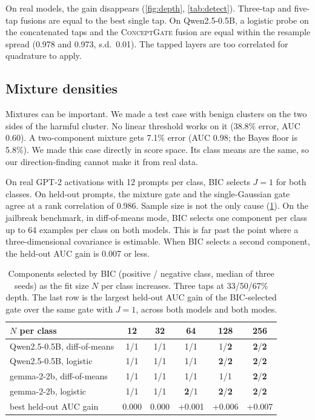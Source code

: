 \documentclass[11pt]{article}
\newcommand{\cg}{\textsc{ConceptGate}}
\begin{document}
On real models, the gain disappears (\cref{fig:depth}, \cref{tab:detect}). Three-tap and five-tap fusions
are equal to the best single tap. On Qwen2.5-0.5B, a logistic probe on the concatenated taps and the \cg{} fusion are equal within the resample spread (0.978 and 0.973, s.d.\ 0.01). The tapped layers are too correlated for quadrature to
apply.

\subsection{Mixture densities}
\label{sec:mixture}
Mixtures can be important. We made a test case with benign clusters on the two sides of the harmful
cluster. No linear threshold works on it (38.8\% error, AUC 0.60). A two-component mixture gets 7.1\%
error (AUC 0.98; the Bayes floor is 5.8\%). We made this case directly in score space. Its class means are
the same, so our direction-finding cannot make it from real data.

On real GPT-2 activations with 12 prompts per class, BIC selects $J=1$ for both classes. On held-out
prompts, the mixture gate and the single-Gaussian gate agree at a rank correlation of 0.986. Sample size is
not the only cause (\cref{tab:bic}). On the jailbreak benchmark, in diff-of-means mode, BIC selects one
component per class up to 64 examples per class on both models. This is far past the point where a
three-dimensional covariance is estimable. When BIC selects a second component, the held-out AUC gain is
0.007 or less.

\begin{table}[t]
\centering
\small
\caption{Components selected by BIC (positive / negative class, median of three seeds) as the fit size
$N$ per class increases. Three taps at 33/50/67\% depth. The last row is the largest held-out AUC gain of
the BIC-selected gate over the same gate with $J=1$, across both models and both modes.}
\label{tab:bic}
\begin{tabular}{lccccc}
\toprule
$N$ per class & 12 & 32 & 64 & 128 & 256 \\
\midrule
Qwen2.5-0.5B, diff-of-means & 1/1 & 1/1 & 1/1 & 1/\textbf{2} & \textbf{2}/\textbf{2} \\
Qwen2.5-0.5B, logistic & 1/1 & 1/1 & 1/1 & \textbf{2}/\textbf{2} & \textbf{2}/\textbf{2} \\
gemma-2-2b, diff-of-means & 1/1 & 1/1 & 1/1 & 1/1 & \textbf{2}/\textbf{2} \\
gemma-2-2b, logistic & 1/1 & 1/1 & \textbf{2}/1 & \textbf{2}/\textbf{2} & \textbf{2}/\textbf{2} \\
\midrule
best held-out AUC gain & 0.000 & 0.000 & +0.001 & +0.006 & +0.007 \\
\bottomrule
\end{tabular}
\end{table}
\end{document}
